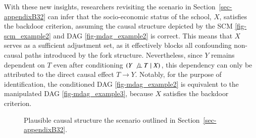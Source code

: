 \documentclass[
  authoryear,
  review,
  1p]{elsarticle}
\begin{document}
With these new insights, researchers revisiting the scenario in
Section~\ref{sec-appendixB32} can infer that the socio-economic status
of the school, \(X\), satisfies the backdoor criterion, assuming the
causal structure depicted by the SCM \ref{fig-scm_example2} and DAG
\ref{fig-mdag_example2} is correct. This means that \(X\) serves as a
sufficient adjustment set, as it effectively blocks all confounding
non-causal paths introduced by the fork structure. Nevertheless, since
\(Y\) remains dependent on \(T\) even after conditioning
\((Y \:\not\bot\:T \mid X)\), this dependency can only be attributed to
the direct causal effect \(T \rightarrow Y\). Notably, for the purpose
of identification, the conditioned DAG \ref{fig-mdag_example2} is
equivalent to the manipulated DAG \ref{fig-mdag_example3}, because \(X\)
satisfies the backdoor criterion.

\begin{figure}

\begin{minipage}{0.50\linewidth}

\centering{

\[
\begin{aligned}
  X & := f_{X}(e_{X}) \\
  T & := t \\
  Y & := f_{Y}(t,X,e_{Y}) \\
  e_{T} & \:\bot\:e_{X} \\
  e_{T} & \:\bot\:e_{Y} \\
  e_{X} & \:\bot\:e_{Y}
\end{aligned}
\]

}


\end{minipage}%
%
\begin{minipage}{0.50\linewidth}



\end{minipage}%

\caption{\label{fig-example3}Plausible causal structure the scenario
outlined in Section~\ref{sec-appendixB32}.}

\end{figure}%
\end{document}
